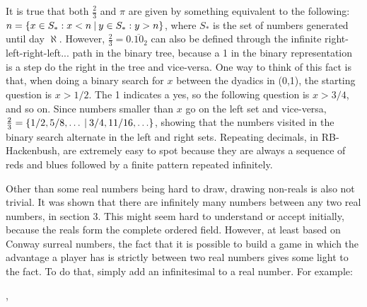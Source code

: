 It is true that both $\frac{2}{3}$ and $\pi$ are given by something equivalent to the following: $n = \mbox{$\{x \in S_*:x < n\:|\:y \in S_*:y>n\}$}$, where $S_*$ is the set of numbers generated until day $\aleph$. However, $\frac{2}{3}=0.\overline{10}_2$ can also be defined through the infinite right-left-right-left... path in the binary tree, because a 1 in the binary representation is a step do the right in the tree and vice-versa. One way to think of this fact is that, when doing a binary search for $x$ between the dyadics in (0,1), the starting question is $x > 1/2$. The 1 indicates a yes, so the following question is $x > 3/4$, and so on. Since numbers smaller than $x$ go on the left set and vice-versa, $\frac{2}{3} = \mbox{$\{1/2, 5/8, \ldots\:|\:3/4,11/16,\ldots\}$}$, showing that the numbers visited in the binary search alternate in the left and right sets. Repeating decimals, in RB-Hackenbush, are extremely easy to spot because they are always a sequence of reds and blues followed by a finite pattern repeated infinitely.

Other than some real numbers being hard to draw, drawing non-reals is also not trivial. It was shown that there are infinitely many numbers between any two real numbers, in section 3. This might seem hard to understand or accept initially, because the reals form the complete ordered field. However, at least based on Conway surreal numbers, the fact that it is possible to build a game in which the advantage a player has is strictly between two real numbers gives some light to the fact. To do that, simply add an infinitesimal to a real number. For example:

\begin{center}
	,
\end{center}

